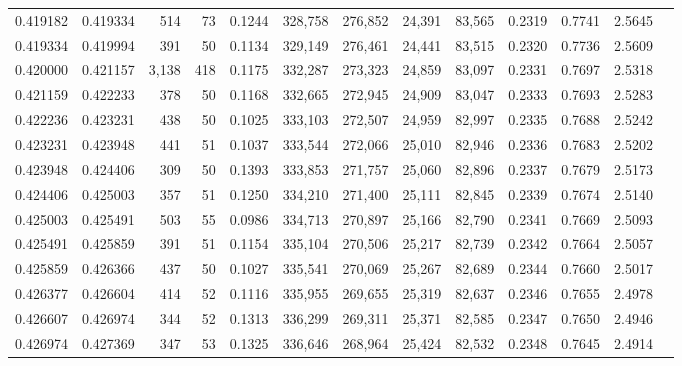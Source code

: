 \begin{tabular}{rrrrrrrrrrrrr}
0.419182 & 0.419334 &   514 &  73 &                                     0.1244 & 328,758 & 276,852 &  24,391 &  83,565 & 0.2319 & 0.7741 & 2.5645 \\
0.419334 & 0.419994 &   391 &  50 &                                     0.1134 & 329,149 & 276,461 &  24,441 &  83,515 & 0.2320 & 0.7736 & 2.5609 \\
0.420000 & 0.421157 & 3,138 & 418 &                                     0.1175 & 332,287 & 273,323 &  24,859 &  83,097 & 0.2331 & 0.7697 & 2.5318 \\
0.421159 & 0.422233 &   378 &  50 &                                     0.1168 & 332,665 & 272,945 &  24,909 &  83,047 & 0.2333 & 0.7693 & 2.5283 \\
0.422236 & 0.423231 &   438 &  50 &                                     0.1025 & 333,103 & 272,507 &  24,959 &  82,997 & 0.2335 & 0.7688 & 2.5242 \\
0.423231 & 0.423948 &   441 &  51 &                                     0.1037 & 333,544 & 272,066 &  25,010 &  82,946 & 0.2336 & 0.7683 & 2.5202 \\
0.423948 & 0.424406 &   309 &  50 &                                     0.1393 & 333,853 & 271,757 &  25,060 &  82,896 & 0.2337 & 0.7679 & 2.5173 \\
0.424406 & 0.425003 &   357 &  51 &                                     0.1250 & 334,210 & 271,400 &  25,111 &  82,845 & 0.2339 & 0.7674 & 2.5140 \\
0.425003 & 0.425491 &   503 &  55 &                                     0.0986 & 334,713 & 270,897 &  25,166 &  82,790 & 0.2341 & 0.7669 & 2.5093 \\
0.425491 & 0.425859 &   391 &  51 &                                     0.1154 & 335,104 & 270,506 &  25,217 &  82,739 & 0.2342 & 0.7664 & 2.5057 \\
0.425859 & 0.426366 &   437 &  50 &                                     0.1027 & 335,541 & 270,069 &  25,267 &  82,689 & 0.2344 & 0.7660 & 2.5017 \\
0.426377 & 0.426604 &   414 &  52 &                                     0.1116 & 335,955 & 269,655 &  25,319 &  82,637 & 0.2346 & 0.7655 & 2.4978 \\
0.426607 & 0.426974 &   344 &  52 &                                     0.1313 & 336,299 & 269,311 &  25,371 &  82,585 & 0.2347 & 0.7650 & 2.4946 \\
0.426974 & 0.427369 &   347 &  53 &                                     0.1325 & 336,646 & 268,964 &  25,424 &  82,532 & 0.2348 & 0.7645 & 2.4914 \\

\end{tabular}
